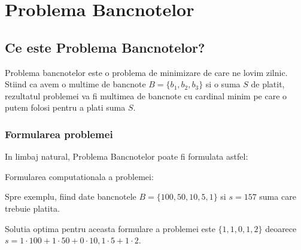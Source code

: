 \chapter{Problema Bancnotelor}

\section{Ce este Problema Bancnotelor?}

Problema bancnotelor este o problema de minimizare de care ne lovim zilnic. Stiind ca avem o  multime de bancnote $ B = \{ b_1, b_2, b_3\}$ si o suma $S$ de platit, rezultatul problemei va fi multimea de bancnote cu cardinal minim pe care o putem folosi pentru a plati suma $S$.

\subsection{Formularea problemei}

In limbaj natural, Problema Bancnotelor poate fi formulata astfel:
\par
\vspace{0.5cm}
\par
\vspace{0.7cm}
Formularea computationala a problemei:\par
\vspace{0.5cm}
\par 
Spre exemplu, fiind date bancnotele $B = \{100,50,10,5,1\}$ si  $s = 157$ suma care trebuie platita. \par
Solutia optima pentru aceasta formulare a problemei este 
$\{1,1,0,1,2\}$ deoarece $ s = 1\cdot 100+1	\cdot 50+0	\cdot10,1	\cdot5+1	\cdot2 $.


